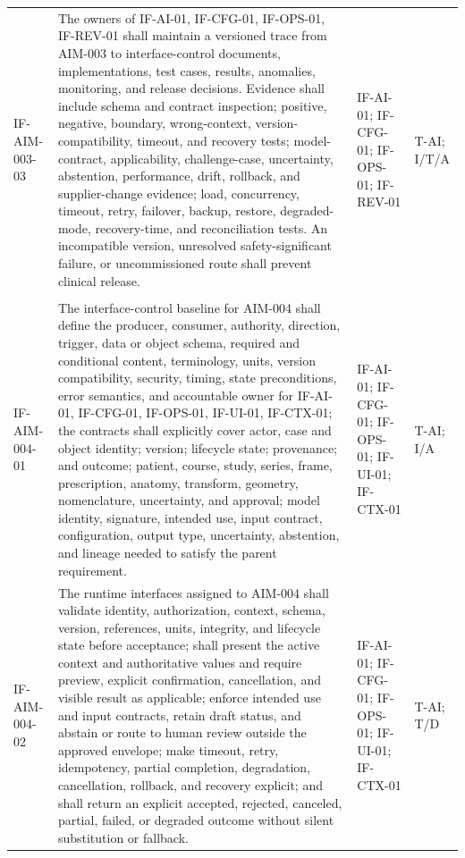 \documentclass[11pt,letterpaper]{article}
\begin{document}
\begin{scriptsize}
\begin{longtable}{@{}L{0.14\textwidth}L{0.49\textwidth}L{0.19\textwidth}L{0.10\textwidth}@{}}
\addlinespace[2pt]
\mbox{IF-AIM-003-03} & The owners of IF-AI-01, IF-CFG-01, IF-OPS-01, IF-REV-01 shall maintain a versioned trace from AIM-003 to interface-control documents, implementations, test cases, results, anomalies, monitoring, and release decisions. Evidence shall include schema and contract inspection; positive, negative, boundary, wrong-context, version-compatibility, timeout, and recovery tests; model-contract, applicability, challenge-case, uncertainty, abstention, performance, drift, rollback, and supplier-change evidence; load, concurrency, timeout, retry, failover, backup, restore, degraded-mode, recovery-time, and reconciliation tests. An incompatible version, unresolved safety-significant failure, or uncommissioned route shall prevent clinical release. & IF-AI-01; IF-CFG-01; IF-OPS-01; IF-REV-01 & T-AI; I\slash\allowbreak{}T\slash\allowbreak{}A \\
\addlinespace[2pt]
 \\
\addlinespace[2pt]
\mbox{IF-AIM-004-01} & The interface-control baseline for AIM-004 shall define the producer, consumer, authority, direction, trigger, data or object schema, required and conditional content, terminology, units, version compatibility, security, timing, state preconditions, error semantics, and accountable owner for IF-AI-01, IF-CFG-01, IF-OPS-01, IF-UI-01, IF-CTX-01; the contracts shall explicitly cover actor, case and object identity; version; lifecycle state; provenance; and outcome; patient, course, study, series, frame, prescription, anatomy, transform, geometry, nomenclature, uncertainty, and approval; model identity, signature, intended use, input contract, configuration, output type, uncertainty, abstention, and lineage needed to satisfy the parent requirement. & IF-AI-01; IF-CFG-01; IF-OPS-01; IF-UI-01; IF-CTX-01 & T-AI; I\slash\allowbreak{}A \\
\addlinespace[2pt]
\mbox{IF-AIM-004-02} & The runtime interfaces assigned to AIM-004 shall validate identity, authorization, context, schema, version, references, units, integrity, and lifecycle state before acceptance; shall present the active context and authoritative values and require preview, explicit confirmation, cancellation, and visible result as applicable; enforce intended use and input contracts, retain draft status, and abstain or route to human review outside the approved envelope; make timeout, retry, idempotency, partial completion, degradation, cancellation, rollback, and recovery explicit; and shall return an explicit accepted, rejected, canceled, partial, failed, or degraded outcome without silent substitution or fallback. & IF-AI-01; IF-CFG-01; IF-OPS-01; IF-UI-01; IF-CTX-01 & T-AI; T\slash\allowbreak{}D \\

\end{longtable}
\end{scriptsize}
\end{document}
